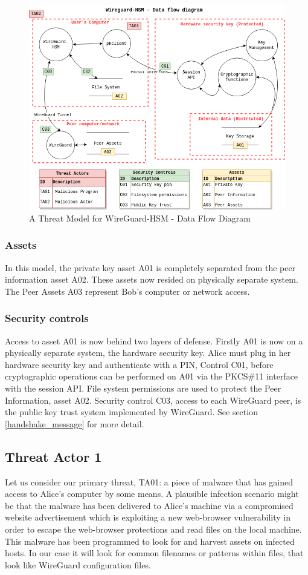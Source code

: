 \documentclass [11pt, proquest] {uwthesis}[2020/02/24]
\begin{document}
\begin{figure}[ht]
\includegraphics[width=14cm]{paper/images/WGHSM_DFD.drawio.png}
\caption{A Threat Model for WireGuard-HSM - Data Flow Diagram}
\label{fig:wg_hsm_dfd}
\end{figure}

\subsubsection{Assets}
In this model, the private key asset A01 is completely separated from the peer information asset A02. These assets now resided on physically separate system. The Peer Assets A03 represent Bob's computer or network access.

\subsubsection{Security controls}
Access to asset A01 is now behind two layers of defense. Firstly A01 is now on a physically separate system, the hardware security key. Alice must plug in her hardware security key and authenticate with a PIN, Control C01, before cryptographic operations can be performed on A01 via the PKCS\#11 interface with the session API.
File system permissions are used to protect the Peer Information, asset A02.
Security control C03, access to each WireGuard peer, is the public key trust system implemented by WireGuard. See section \ref{handshake_message} for more detail.

\subsection{Threat Actor 1}
Let us consider our primary threat, TA01: a piece of malware that has gained access to Alice's computer by some means. A plausible infection scenario might be that the malware has been delivered to Alice's machine via a compromised website advertisement which is exploiting a new web-browser vulnerability in order to escape the web-browser protections and read files on the local machine.  This malware has been programmed to look for and harvest assets on infected hosts. In our case it will look for common filenames or patterns within files, that look like WireGuard configuration files.  
\end{document}
